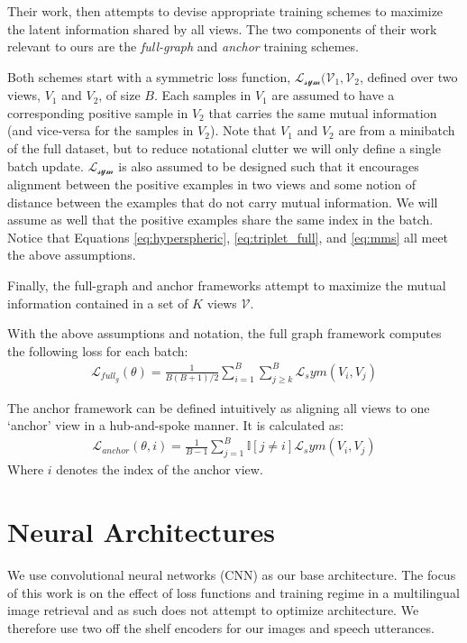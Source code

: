 Their work, then attempts to devise appropriate training schemes to maximize the latent information shared by all views.
The two components of their work relevant to ours are the \textit{full-graph} and \textit{anchor} training schemes.

Both schemes start with a symmetric loss function, $\mathcal{L_{sym}(V_1,V_2}$, defined over two views, $V_1$ and $V_2$, of size $B$.
Each samples in $V_1$ are assumed to have a corresponding positive sample in $V_2$ that carries the same mutual information (and vice-versa for the samples in $V_2$).
Note that $V_1$ and $V_2$ are from a minibatch of the full dataset, but to reduce notational clutter we will only define a single batch update.
$\mathcal{L_{sym}}$ is also assumed to be designed such that it encourages alignment between the positive examples in two views and some notion of distance between the examples that do not carry mutual information.
We will assume as well that the positive examples share the same index in the batch. 
Notice that Equations \ref{eq:hyperspheric}, \ref{eq:triplet_full}, and \ref{eq:mms} all meet the above assumptions.

Finally, the full-graph and anchor frameworks attempt to maximize the mutual information contained in a set of $K$ views $\mathcal{V}$.

With the above assumptions and notation, the full graph framework computes the following loss for each batch:
\begin{align*}
    \mathcal{L}_{full_g}(\theta) = \frac{1}{B(B+1)/2}\sum_{i=1}^B \sum_{j\geq k}^B \mathcal{L}_sym(V_i, V_j)
\end{align*}

The anchor framework can be defined intuitively as aligning all views to one `anchor' view in a hub-and-spoke manner.
It is calculated as:
\begin{align*}
    \mathcal{L}_{anchor}(\theta, i) = \frac{1}{B-1}\sum_{j=1}^{B} \mathbb{I}[j\neq i] \mathcal{L}_sym(V_i, V_j)
\end{align*}
Where $i$ denotes the index of the anchor view.
\section{Neural Architectures}
We use convolutional neural networks (CNN) as our base architecture. 
The focus of this work is on the effect of loss functions and training regime in a multilingual image retrieval and as such does not attempt to optimize architecture.
We therefore use two off the shelf encoders for our images and speech utterances.
